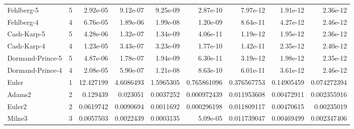 \documentclass[conference,onecolumn,12pt]{IEEEtran}
\begin{document}
\begin{table}[htbp]
{\begin{tabular}{lrccccccc}
  Fehlberg-5 & 5     & \multicolumn{1}{r}{2.92e-05} & \multicolumn{1}{r}{9.12e-07} & \multicolumn{1}{r}{9.25e-09} & \multicolumn{1}{r}{2.87e-10} & \multicolumn{1}{r}{7.97e-12} & \multicolumn{1}{r}{1.91e-12} & \multicolumn{1}{r}{2.36e-12} \\
  Fehlberg-4 & 4     & \multicolumn{1}{r}{6.76e-05} & \multicolumn{1}{r}{1.89e-06} & \multicolumn{1}{r}{1.99e-08} & \multicolumn{1}{r}{1.20e-09} & \multicolumn{1}{r}{8.64e-11} & \multicolumn{1}{r}{4.27e-12} & \multicolumn{1}{r}{2.46e-12} \\
  Cash-Karp-5 & 5     & \multicolumn{1}{r}{4.28e-06} & \multicolumn{1}{r}{1.32e-07} & \multicolumn{1}{r}{1.34e-09} & \multicolumn{1}{r}{4.06e-11} & \multicolumn{1}{r}{1.19e-12} & \multicolumn{1}{r}{1.95e-12} & \multicolumn{1}{r}{2.36e-12} \\
  Cash-Karp-4 & 4     & \multicolumn{1}{r}{1.23e-05} & \multicolumn{1}{r}{3.43e-07} & \multicolumn{1}{r}{3.23e-09} & \multicolumn{1}{r}{1.77e-10} & \multicolumn{1}{r}{1.42e-11} & \multicolumn{1}{r}{2.35e-12} & \multicolumn{1}{r}{2.40e-12} \\
  Dormand-Prince-5 & 5     & \multicolumn{1}{r}{4.87e-06} & \multicolumn{1}{r}{1.78e-07} & \multicolumn{1}{r}{1.94e-09} & \multicolumn{1}{r}{6.30e-11} & \multicolumn{1}{r}{3.19e-12} & \multicolumn{1}{r}{1.98e-12} & \multicolumn{1}{r}{2.35e-12} \\
  Dormand-Prince-4 & 4     & \multicolumn{1}{r}{2.08e-05} & \multicolumn{1}{r}{5.90e-07} & \multicolumn{1}{r}{1.21e-08} & \multicolumn{1}{r}{8.63e-10} & \multicolumn{1}{r}{6.01e-11} & \multicolumn{1}{r}{3.61e-12} & \multicolumn{1}{r}{2.46e-12} \\
  Euler & 1     & \multicolumn{1}{r}{12.427199} & \multicolumn{1}{r}{4.6086493} & \multicolumn{1}{r}{1.5965305} & \multicolumn{1}{r}{0.765861096} & \multicolumn{1}{r}{0.376567753} & \multicolumn{1}{r}{0.14905459} & \multicolumn{1}{r}{0.074272394} \\
  Adams2 & 2     & \multicolumn{1}{r}{0.129439} & \multicolumn{1}{r}{0.023051} & \multicolumn{1}{r}{0.0037252} & \multicolumn{1}{r}{0.000972439} & \multicolumn{1}{r}{0.011953608} & \multicolumn{1}{r}{0.00472911} & \multicolumn{1}{r}{0.002355916} \\
  Euler2 & 2     & \multicolumn{1}{r}{0.0619742} & \multicolumn{1}{r}{0.0090694} & \multicolumn{1}{r}{0.0011692} & \multicolumn{1}{r}{0.000296198} & \multicolumn{1}{r}{0.011809117} & \multicolumn{1}{r}{0.00470615} & \multicolumn{1}{r}{0.00235019} \\
  Milne3 & 3     & \multicolumn{1}{r}{0.0057503} & \multicolumn{1}{r}{0.0022439} & \multicolumn{1}{r}{0.0003135} & \multicolumn{1}{r}{5.09e-05} & \multicolumn{1}{r}{0.011739047} & \multicolumn{1}{r}{0.00469499} & \multicolumn{1}{r}{0.002347406} \\

\end{tabular}}
\end{table}
\end{document}
